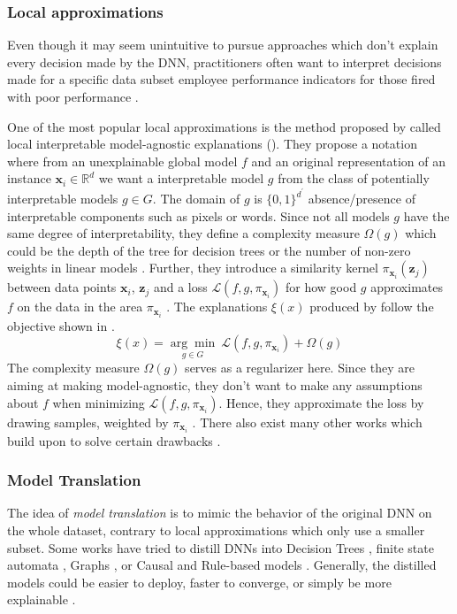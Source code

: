 \subsubsection{Local approximations}

Even though it may seem unintuitive to pursue approaches which don't explain every decision made by the DNN, practitioners often want to interpret decisions made for a specific data subset \eg employee performance indicators for those fired with poor performance \citep{xie2020explainable}. 

One of the most popular local approximations is the method proposed by \citet{Ribeiro0G16} called local interpretable model-agnostic explanations (\lime). They propose a notation where from an unexplainable global model $f$ and an original representation of an instance $\mathbf{x}_i \in \mathbb{R}^d$ we want a interpretable model $g$ from the class of potentially interpretable models $g \in G$. The domain of $g$ is $\{0,1\}^{d^{\prime}}$ \ie absence/presence of interpretable components such as pixels or words. Since not all models $g$ have the same degree of interpretability, they define a complexity measure $\Omega(g)$ which could be the depth of the tree for decision trees or the number of non-zero weights in linear models \citep{Ribeiro0G16}. Further, they introduce a similarity kernel $\pi_{\mathbf{x}_i}(\mathbf{z}_j)$ between data points $\mathbf{x}_i$,  $\mathbf{z}_j$ and a loss $\mathcal{L}(f,g,\pi_{\mathbf{x}_i})$ for how good $g$ approximates $f$ on the data in the area $\pi_{\mathbf{x}_i}$ \citep{xie2020explainable}. The explanations $\xi(x)$ produced by \lime{} follow the objective shown in .
\begin{equation}
\label{eq:lime_min}
    \xi(x)=\underset{g \in G}{\arg\min}\ \mathcal{L}\left(f, g, \pi_{\mathbf{x}_i}\right)+\Omega(g)
\end{equation}
The complexity measure $\Omega(g)$ serves as a regularizer here. Since they are aiming at making \lime{} model-agnostic, they don't want to make any assumptions about $f$ when minimizing $\mathcal{L}\left(f, g, \pi_{\mathbf{x}_i}\right)$. Hence, they approximate the loss by drawing samples, weighted by $\pi_{\mathbf{x}_i}$ \citep{Ribeiro0G16}. There also exist many other works which build upon \lime{} to solve certain drawbacks  \citep{ElenbergDFK17, Ribeiro0G18}.

\subsubsection{Model Translation}
The idea of \emph{model translation} is to mimic the behavior of the original DNN on the whole dataset, contrary to local approximations which only use a smaller subset. Some works have tried to distill DNNs into Decision Trees \citep{FrosstH17, tan2018learning, ZhangYMW19}, finite state automata \citep{HouZ20}, Graphs \citep{ZhangCWZ17, ZhangCSWZ18, ZhangYMW19}, or Causal and Rule-based models \citep{harradon2018causal, MurdochS17}. Generally, the distilled models could be easier to deploy, faster to converge, or simply be more explainable \citep{xie2020explainable}.

